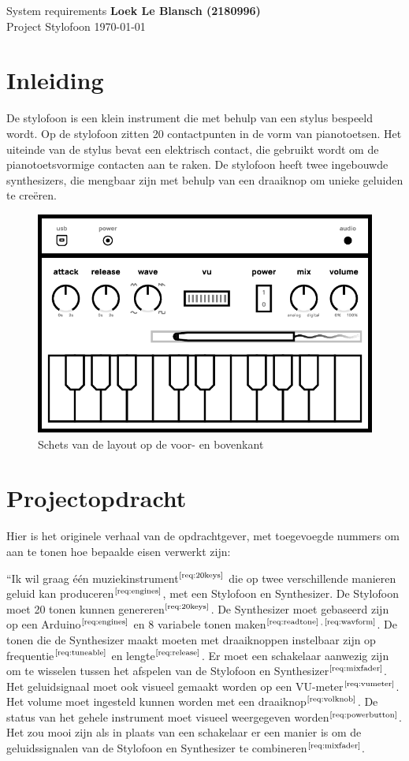 \documentclass[12pt, a4paper, dutch]{article}
\newcommand{\req}[1]{$^{\text{\ref{req:#1}}}$}
\newcommand{\up}[1]{$^{\text{#1}}$}
\begin{document}
System requirements \hfill \textbf{Loek Le Blansch (2180996)}\\
Project Stylofoon \hfill \today
\medskip

\section{Inleiding}

De stylofoon is een klein instrument die met behulp van een stylus bespeeld wordt. Op
de stylofoon zitten 20 contactpunten in de vorm van pianotoetsen. Het uiteinde van de
stylus bevat een elektrisch contact, die gebruikt wordt om de pianotoetsvormige
contacten aan te raken. De stylofoon heeft twee ingebouwde synthesizers, die mengbaar
zijn met behulp van een draaiknop om unieke geluiden te cre\"eren.

\begin{figure}[H]
	\centering
	\includegraphics{figs/case-layout-sketch.pdf}
	\caption{Schets van de layout op de voor- en bovenkant}
\end{figure}

\section{Projectopdracht}

Hier is het originele verhaal van de opdrachtgever, met toegevoegde nummers om aan te
tonen hoe bepaalde eisen verwerkt zijn:

``Ik wil graag één muziekinstrument\req{20keys} die op twee verschillende manieren
geluid kan produceren\req{engines}, met een Stylofoon en Synthesizer. De Stylofoon
moet 20 tonen kunnen genereren\req{20keys}. De Synthesizer moet gebaseerd zijn op een
Arduino\req{engines} en 8 variabele tonen maken\req{readtone}\up{,}\req{wavform}. De
tonen die de Synthesizer maakt moeten met draaiknoppen instelbaar zijn op
frequentie\req{tuneable} en lengte\req{release}. Er moet een schakelaar aanwezig zijn
om te wisselen tussen het afspelen van de Stylofoon en Synthesizer\req{mixfader}. Het
geluidsignaal moet ook visueel gemaakt worden op een VU-meter\req{vumeter}. Het
volume moet ingesteld kunnen worden met een draaiknop\req{volknob}. De status van het
gehele instrument moet visueel weergegeven worden\req{powerbutton}. Het zou mooi zijn
als in plaats van een schakelaar er een manier is om de geluidssignalen van de
Stylofoon en Synthesizer te combineren\req{mixfader}.
\end{document}
